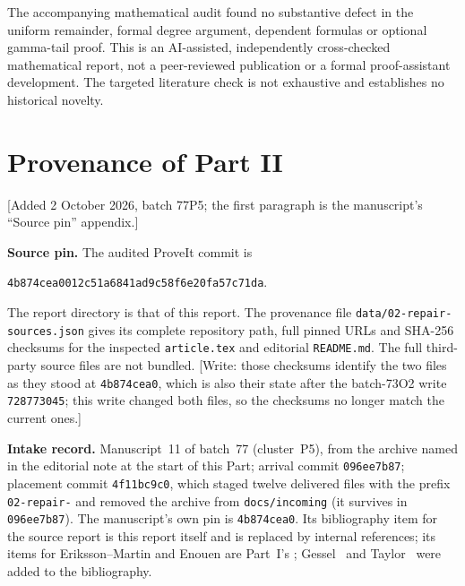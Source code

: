\documentclass[11pt,letterpaper]{article}
\theoremstyle{definition}
\theoremstyle{remark}
\begin{document}
The accompanying mathematical audit found no substantive defect in the
uniform remainder, formal degree argument, dependent formulas or optional
gamma-tail proof.  This is an AI-assisted, independently cross-checked
mathematical report, not a peer-reviewed publication or a formal
proof-assistant development.  The targeted literature check is not
exhaustive and establishes no historical novelty.

\section{Provenance of Part II}\label{bsw:rp:sec:provenance}

[Added 2 October 2026, batch 77P5; the first paragraph is the manuscript's
``Source pin'' appendix.]

\textbf{Source pin.}  The audited ProveIt commit is
\begin{center}\small\texttt{4b874cea0012c51a6841ad9c58f6e20fa57c71da}.\end{center}
\begin{sloppypar}\noindent
The report directory is that of this report.  The provenance file
\texttt{data/02-repair-sources.json} gives its complete repository path,
full pinned URLs and SHA-256 checksums for the inspected
\texttt{article.tex} and editorial \texttt{README.md}.  The full
third-party source files are not bundled.  [Write: those checksums identify
the two files as they stood at \texttt{4b874cea0}, which is also their
state after the batch-73O2 write \texttt{728773045}; this write changed
both files, so the checksums no longer match the current ones.]
\end{sloppypar}

\textbf{Intake record.}  Manuscript~11 of batch~77 (cluster~P5), from the
archive named in the editorial note at the start of this Part; arrival
commit \texttt{096ee7b87}; placement commit \texttt{4f11bc9c0}, which staged twelve
delivered files with the prefix \texttt{02-repair-} and removed the archive
from \texttt{docs/incoming} (it survives in \texttt{096ee7b87}).  The
manuscript's own pin is \texttt{4b874cea0}.  Its bibliography item for the
source report is this report itself and is replaced by internal
references; its items for Eriksson--Martin and Enouen are Part~I's
\cite{eriksson-martin,enouen}; Gessel~\cite{gessel} and
Taylor~\cite{taylor} were added to the bibliography.
\end{document}
